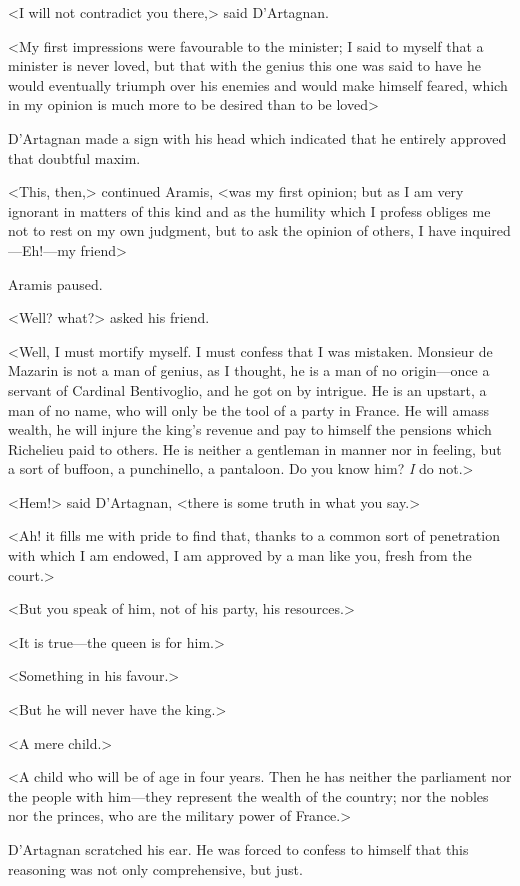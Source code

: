 <I will not contradict you there,> said D'Artagnan.

<My first impressions were favourable to the minister; I said to myself that a minister is never loved, but that with the genius this one was said to have he would eventually triumph over his enemies and would make himself feared, which in my opinion is much more to be desired than to be loved\longdash>

D'Artagnan made a sign with his head which indicated that he entirely approved that doubtful maxim.

<This, then,> continued Aramis, <was my first opinion; but as I am very ignorant in matters of this kind and as the humility which I profess obliges me not to rest on my own judgment, but to ask the opinion of others, I have inquired—Eh!—my friend\longdash>

Aramis paused.

<Well? what?> asked his friend.

<Well, I must mortify myself. I must confess that I was mistaken. Monsieur de Mazarin is not a man of genius, as I thought, he is a man of no origin—once a servant of Cardinal Bentivoglio, and he got on by intrigue. He is an upstart, a man of no name, who will only be the tool of a party in France. He will amass wealth, he will injure the king's revenue and pay to himself the pensions which Richelieu paid to others. He is neither a gentleman in manner nor in feeling, but a sort of buffoon, a punchinello, a pantaloon. Do you know him? \emph{I} do not.>

<Hem!> said D'Artagnan, <there is some truth in what you say.>

<Ah! it fills me with pride to find that, thanks to a common sort of penetration with which I am endowed, I am approved by a man like you, fresh from the court.>

<But you speak of him, not of his party, his resources.>

<It is true—the queen is for him.>

<Something in his favour.>

<But he will never have the king.>

<A mere child.>

<A child who will be of age in four years. Then he has neither the parliament nor the people with him—they represent the wealth of the country; nor the nobles nor the princes, who are the military power of France.>

D'Artagnan scratched his ear. He was forced to confess to himself that this reasoning was not only comprehensive, but just.

